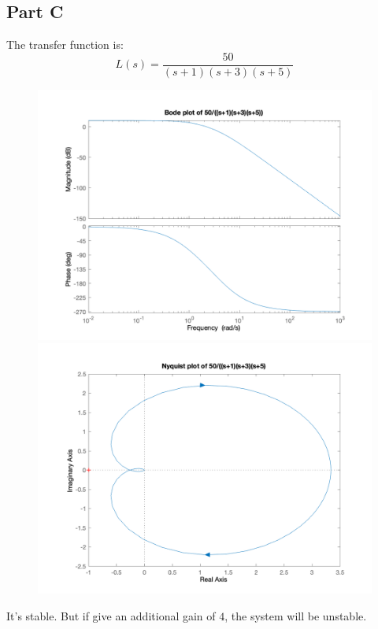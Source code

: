 \documentclass[a4paper]{article}
\begin{document}
\subsection{Part C} 
The transfer function is:
$$
L(s) = \frac{50}{(s+1)(s+3)(s+5)}
$$
\begin{figure}[H]
\centering
\begin{minipage}[t]{0.48\textwidth}
\centering
\includegraphics[width=\textwidth]{pic/5.png}
\end{minipage}
\begin{minipage}[t]{0.48\textwidth}
\centering
\includegraphics[width=\textwidth]{pic/6.png}
\end{minipage}
\end{figure}
It's stable. But if give an additional gain of $4$, the system will be unstable.
\end{document}
